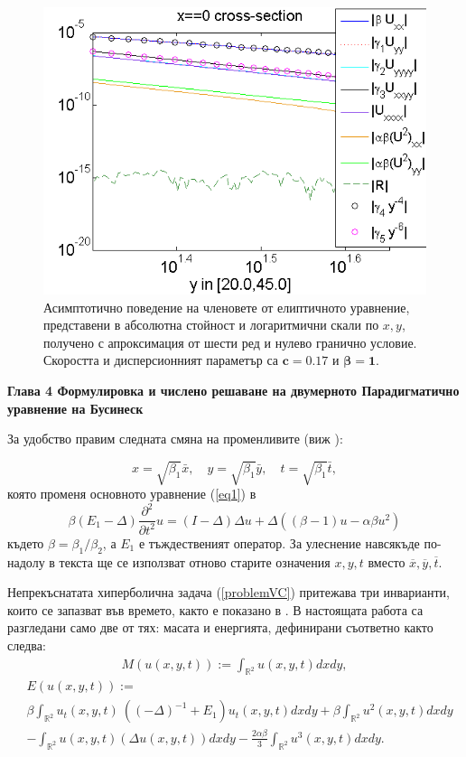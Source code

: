 \documentclass[a5paper]{article}
\newcommand{\be}{\begin{equation}}
\newcommand{\ee}{\end{equation}}
\newcommand{\rf}[1]{(\ref{#1})}
\newcommand{\RR}{\mathbb{R}}
\theoremstyle{remark}
\begin{document}
\begin{large}
\begin{figure}[ht]
\begin{minipage}[b]{0.85\linewidth}
		\includegraphics[width=\linewidth]{AssymptForEachTerm/c017_bt1_5/ChristovIC_AlongY_50_ZB2_bt1_c017_h020_O(h^6).png}
	\end{minipage}
	\caption{Асимптотично поведение на членовете от елиптичното уравнение, представени в абсолютна стойност и логаритмични скали по $x,y$, получено с апроксимация от шести ред и нулево гранично условие. Скоростта и дисперсионният параметър са $\boldsymbol{c=0.17}$ и $\boldsymbol{\beta = 1}$. }
	\label{fig:assympt_c017bt1}
\end{figure}
\FloatBarrier

\newpage
\textbf{Глава 4 Формулировка и числено решаване на двумерното Парадигматично уравнение на Бусинеск} 

За удобство правим следната смяна на променливите (виж \cite{ref25}):

\be\label{vcHyp}
x = \sqrt{\beta_1} \bar{x}, \quad y = \sqrt{\beta_1} \bar{y}, \quad t = \sqrt{\beta_1} \bar{t} ,
\ee
която променя основното уравнение \rf{eq1} в
\be\label{problemVC}
 \beta (E_1-\Delta) \frac{\partial^2}{\partial t^2}u= 
(I-\Delta)\Delta u +\Delta( (\beta - 1 )u - \alpha \beta u^2 )
\ee
където $\beta = \beta_1/\beta_2$, а $E_1$ е тъждественият оператор. За улеснение навсякъде по-надолу в текста ще се използват отново старите означения $x,y,t$ вместо ${\overline x},{\overline y},{\overline t}$.

Непрекъснатата хиперболична задача \rf{problemVC} притежава три инварианти, които се запазват във времето, както е показано в \cite{ref1}. В настоящата работа са разгледани само две от тях: масата и енергията, дефинирани съответно както следва:
\begin{align}\label{intM}
M(u(x,y,t)):=\int_{\RR^2} u(x,y,t)dx dy,
\end{align}
\begin{align}\label{ex-en}
&E(u(x,y,t)):= \nonumber\\ 
&\beta \int_{\RR^2} u_t(x,y,t) \: \left((-\Delta )^{-1}+E_1\right)u_t(x,y,t) dxdy+
\beta \int_{\RR^2} u^2(x,y,t) dxdy \nonumber\\
&-\int_{\RR^2}u(x,y,t) \left(\Delta u(x,y,t)\right) dxdy - \frac{2 \alpha \beta}{3} \int_{\RR^2} u^3(x,y,t) dxdy.
\end{align}


\end{large}
\end{document}
